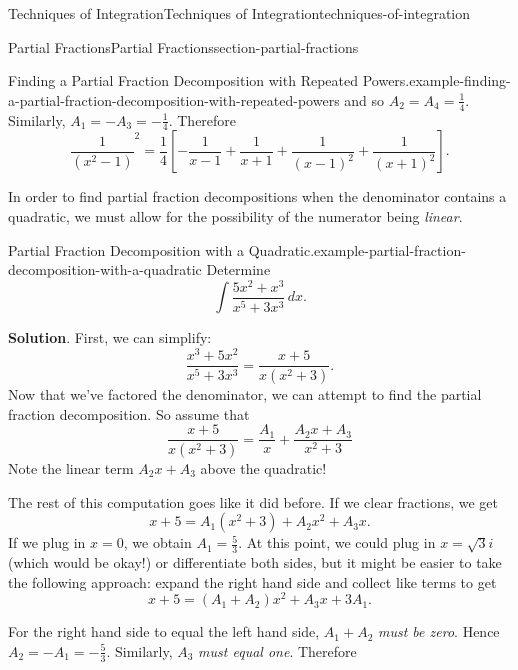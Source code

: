 \documentclass[oneside,10pt,]{book}
\numberwithin{equation}{section}
\begin{document}
\begin{chapterptx}{Techniques of Integration}{}{Techniques of Integration}{}{}{techniques-of-integration}
\begin{sectionptx}{Partial Fractions}{}{Partial Fractions}{}{}{section-partial-fractions}
\begin{example}{Finding a Partial Fraction Decomposition with Repeated Powers.}{example-finding-a-partial-fraction-decomposition-with-repeated-powers}
and so \(A_{2} = A_{4} = \frac{1}{4}\). Similarly, \(A_{1} = - A_{3} = -\frac{1}{4}\). Therefore%
\begin{equation*}
\frac{1}{(x^{2} - 1)}^{2} = \frac{1}{4}\left[-\frac{1}{x-1} + \frac{1}{x+1} + \frac{1}{(x-1)^{2}} + \frac{1}{(x+1)^{2}}\right].
\end{equation*}
%
\end{example}
\hypertarget{p-559}{}%
In order to find partial fraction decompositions when the denominator contains a quadratic, we must allow for the possibility of the numerator being \emph{linear}.%
\begin{example}{Partial Fraction Decomposition with a Quadratic.}{example-partial-fraction-decomposition-with-a-quadratic}%
\hypertarget{p-560}{}%
Determine%
\begin{equation*}
\int\frac{5x^{2} + x^{3}}{x^{5} + 3x^{3}}\,dx.
\end{equation*}
%
\par\smallskip%
\noindent\textbf{Solution}.\hypertarget{solution-123}{}\quad%
\hypertarget{p-561}{}%
First, we can simplify:%
\begin{equation*}
\frac{x^{3} + 5x^{2}}{x^{5} + 3x^{3}} = \frac{x + 5}{x(x^{2} + 3)}.
\end{equation*}
Now that we've factored the denominator, we can attempt to find the partial fraction decomposition. So assume that%
\begin{equation*}
\frac{x + 5}{x(x^{2} + 3)} = \frac{A_{1}}{x} + \frac{A_{2}x + A_{3}}{x^{2} + 3}
\end{equation*}
Note the linear term \(A_{2}x + A_{3}\) above the quadratic!%
\par
\hypertarget{p-562}{}%
The rest of this computation goes like it did before. If we clear fractions, we get%
\begin{equation*}
x + 5 = A_{1}(x^{2} + 3) + A_{2}x^{2} + A_{3}x.
\end{equation*}
If we plug in \(x = 0\), we obtain \(A_{1} = \frac{5}{3}\). At this point, we could plug in \(x = \sqrt{3}i\) (which would be okay!) or differentiate both sides, but it might be easier to take the following approach: expand the right hand side and collect like terms to get%
\begin{equation*}
x + 5 = (A_{1} + A_{2})x^{2} + A_{3}x + 3A_{1}.
\end{equation*}
%
\par
\hypertarget{p-563}{}%
For the right hand side to equal the left hand side, \(A_{1} + A_{2}\) \emph{must be zero}. Hence \(A_{2} = -A_{1} = -\frac{5}{3}\). Similarly, \(A_{3}\) \emph{must equal one}. Therefore%

\end{example}
\end{sectionptx}
\end{chapterptx}
\end{document}
